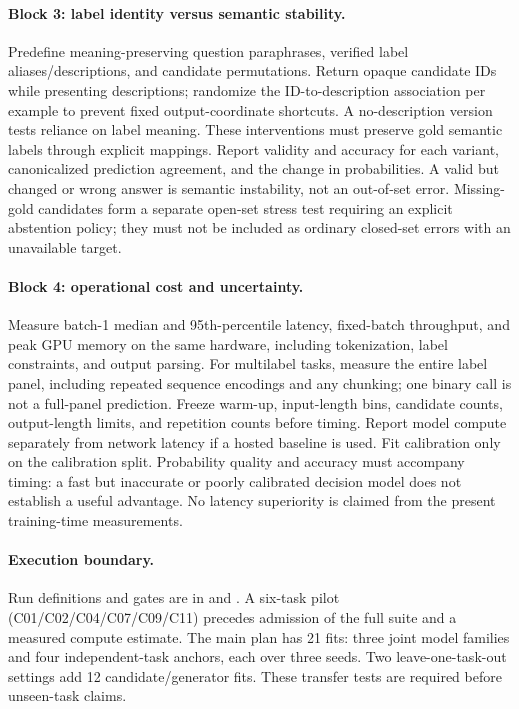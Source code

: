 \paragraph{Block 3: label identity versus semantic stability.}
Predefine meaning-preserving question paraphrases, verified label aliases/descriptions, and candidate permutations. Return opaque candidate IDs while presenting descriptions; randomize the ID-to-description association per example to prevent fixed output-coordinate shortcuts. A no-description version tests reliance on label meaning. These interventions must preserve gold semantic labels through explicit mappings. Report validity and accuracy for each variant, canonicalized prediction agreement, and the change in probabilities. A valid but changed or wrong answer is semantic instability, not an out-of-set error. Missing-gold candidates form a separate open-set stress test requiring an explicit abstention policy; they must not be included as ordinary closed-set errors with an unavailable target.

\paragraph{Block 4: operational cost and uncertainty.}
Measure batch-1 median and 95th-percentile latency, fixed-batch throughput, and peak GPU memory on the same hardware, including tokenization, label constraints, and output parsing. For multilabel tasks, measure the entire label panel, including repeated sequence encodings and any chunking; one binary call is not a full-panel prediction. Freeze warm-up, input-length bins, candidate counts, output-length limits, and repetition counts before timing. Report model compute separately from network latency if a hosted baseline is used. Fit calibration only on the calibration split. Probability quality and accuracy must accompany timing: a fast but inaccurate or poorly calibrated decision model does not establish a useful advantage. No latency superiority is claimed from the present training-time measurements.

\paragraph{Execution boundary.}
Run definitions and gates are in  and . A six-task pilot (C01/C02/C04/C07/C09/C11) precedes admission of the full suite and a measured compute estimate. The main plan has 21 fits: three joint model families and four independent-task anchors, each over three seeds. Two leave-one-task-out settings add 12 candidate/generator fits. These transfer tests are required before unseen-task claims.
